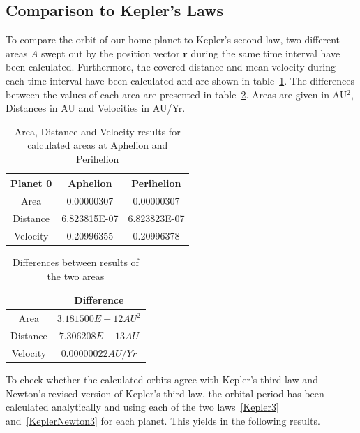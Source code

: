 \documentclass[reprint,english,notitlepage]{revtex4-2}
\begin{document}
\subsection{Comparison to Kepler's Laws}
	To compare the orbit of our home planet to Kepler's second law, two different areas $A$ swept out by the position vector $ \textbf{r}$ during the same time interval have been calculated.
	Furthermore, the covered distance and mean velocity during each time interval have been calculated and are shown in table~\ref{tab:Kepler2_table1}.
	The differences between the values of each area are presented in table~\ref{tab:Kepler2_table2}. Areas are given in AU$^2$, Distances in AU and Velocities in AU/Yr.
\begin{table}[h]
    \begin{tabular}{ |c|c|c| }
		\hline
        Planet 0 & Aphelion & Perihelion\\
        \hline
        Area & 0.00000307 & 0.00000307\\
        \hline
		Distance & 6.823815E-07 & 6.823823E-07\\
		\hline
		Velocity & 0.20996355 & 0.20996378\\
		\hline
    \end{tabular}
	\caption{Area, Distance and Velocity results for calculated areas at Aphelion and Perihelion}
	\label{tab:Kepler2_table1}
\end{table}




\begin{table}[h]
    \begin{tabular}{ |c|c| }
		\hline
		 & Difference\\
		\hline
		Area & $ 3.181500E-12 AU^2 $\\
		\hline
		Distance & $ 7.306208E-13 AU $\\
		\hline
		Velocity & $  0.00000022 AU/Yr $\\
		\hline
	\end{tabular}
    \caption{Differences between results of the two areas}
    \label{tab:Kepler2_table2}
\end{table}

	To check whether the calculated orbits agree with Kepler's third law and Newton's revised version of Kepler's third law, the orbital period has been calculated analytically and using each of the two laws~\eqref{Kepler3} and~\eqref{KeplerNewton3} for each planet.
	This yields in the following results.\\
\end{document}
